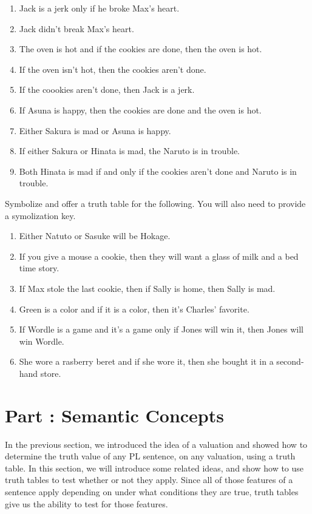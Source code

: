 \begin{enumerate}
\item Jack is a jerk only if he broke Max's heart.
\item Jack didn't break Max's heart.
\item The oven is hot and if the cookies are done, then the oven is hot.
\item If the oven isn't hot, then the cookies aren't done.
\item If the coookies aren't done, then Jack is a jerk.
\item If Asuna is happy, then the cookies are done and the oven is hot.
\item Either Sakura is mad or Asuna is happy.
\item If either Sakura or Hinata is mad, the Naruto is in trouble.
\item Both Hinata is mad if and only if the cookies aren't done and Naruto is in trouble.  
\end{enumerate}
\problempart
Symbolize and offer a truth table for the following. You will also need to provide a symolization key.
\begin{enumerate}
\item Either Natuto or Sasuke will be Hokage.
\item If you give a mouse a cookie, then they will want a glass of milk and a bed time story.
\item If Max stole the last cookie, then if Sally is home, then Sally is mad.
\item Green is a color and if it is a color, then it's Charles' favorite.
\item If Wordle is a game and it's a game only if Jones will win it, then Jones will win Wordle.
\item She wore a rasberry beret and if she wore it, then she bought it in a second-hand store. 
\end{enumerate}


\setcounter{seccount}{1}
\chapter{Part \thechapcount: Semantic Concepts}
\label{chap.semanticconcepts}
In the previous section, we introduced the idea of a valuation and showed how to determine the truth value of any PL sentence, on any valuation, using a truth table. In this section, we will introduce some related ideas, and show how to use truth tables to test whether or not they apply. Since all of those features of a sentence apply depending on under what conditions they are true, truth tables give us the ability to test for those features. 

